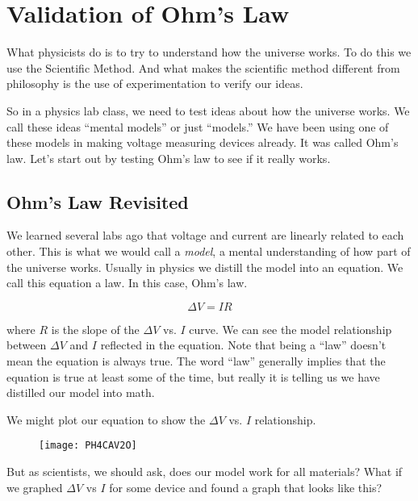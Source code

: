 \chapter{Validation of Ohm's Law}
\vspace{-0.25in}
What physicists do is to try to understand how the universe works. To do this we use the Scientific Method. And what makes the scientific method different from philosophy is the use of experimentation to verify our ideas.

So in a physics lab class, we need to test ideas about how the universe works. We call these ideas ``mental models'' or just ``models.'' We have been using one of these models in making voltage measuring devices already. It was called Ohm's law. Let's start out by testing Ohm's law to see if it really works.

\section{Ohm's Law Revisited}

We learned several labs ago that voltage and current are linearly related to each other. This is what we would call a \emph{model}, a mental understanding of how part of the universe works. Usually in physics we distill the model into an equation. We call this equation a law. In this case, Ohm's law. 

\begin{equation*}
	\Delta V=IR
\end{equation*}

\noindent where $R$ is the slope of the $\Delta V$ vs. $I$ curve. We can see the model relationship between $\Delta V$ and $I$ reflected in the equation. Note that being a ``law'' doesn't mean the equation is always true. The word ``law'' generally implies that the equation is true at least some of the time, but really it is telling us we have distilled our model into math.

We might plot our equation to show the $\Delta V$ vs. $I$ relationship.

\begin{figure}[h!]
	\centering
	\texttt{[image: PH4CAV2O]}
\end{figure}



\noindent But as scientists, we should ask, does our model work for all materials? What if we graphed $\Delta V$ vs $I$ for some device and found a graph that looks like this?


